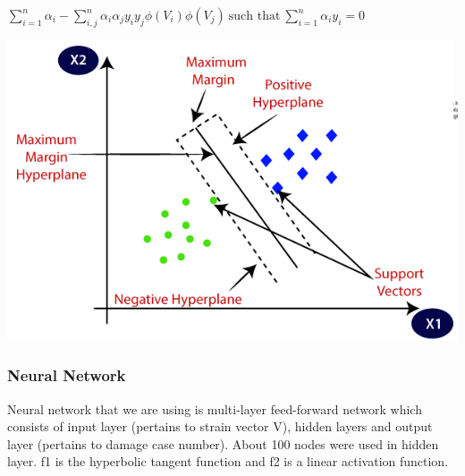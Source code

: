 \documentclass{article}
\begin{document}
\begin{center}
    $\sum^n_{i=1}\alpha_{i} - \sum^n_{i,j}\alpha_{i} \alpha_{j}y_{i}y_{j}\phi(V_{i})\phi(V_{j}) \ \text{such that} \ \sum^n_{i=1}\alpha_{i}y_{i} = 0$

    \includegraphics[scale=0.39]{Images/support-vector-machine-algorithm.png}


\end{center}

\subsubsection{Neural Network}
Neural network that we are using is multi-layer feed-forward network which consists of input layer (pertains to strain vector V), hidden layers and output layer (pertains to damage case number). About 100 nodes were used in hidden layer. f1 is the hyperbolic tangent function and f2 is a linear activation function.
\end{document}
